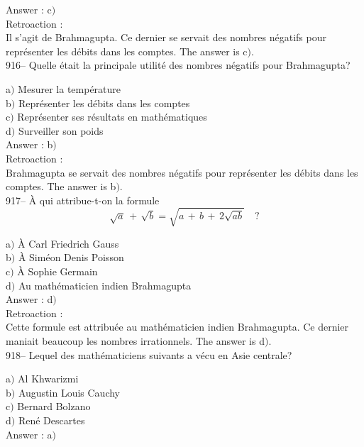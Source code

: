 ﻿\documentclass[letterpaper, 12pt]{article}
\begin{document}
Answer : c$)$\\

Retroaction : \\
Il s'agit de Brahmagupta. Ce dernier se servait des nombres n\'egatifs pour
repr\'esenter les d\'ebits dans les comptes. The answer is c$)$.\\

916-- Quelle \'etait la principale utilit\'e des nombres n\'egatifs
pour Brahmagupta?

a$)$ Mesurer la temp\'erature \\
b$)$ Repr\'esenter les d\'ebits dans les comptes \\
c$)$ Repr\'esenter ses r\'esultats en math\'ematiques \\
d$)$ Surveiller son poids  \\

Answer : b$)$\\

Retroaction : \\
Brahmagupta se servait des nombres n\'egatifs pour repr\'esenter les
d\'ebits dans les comptes. The answer is b$)$.\\

917-- \`A qui attribue-t-on la formule
$$\sqrt a\,+\,\sqrt b=\sqrt{a\,+\,b\,+\,2\sqrt{ab}}\quad?$$

a$)$ \`A Carl Friedrich Gauss \\
b$)$ \`A Sim\'eon Denis Poisson \\
c$)$ \`A Sophie Germain \\
d$)$ Au math\'ematicien indien Brahmagupta  \\

Answer : d$)$\\

Retroaction : \\
Cette formule est attribu\'ee au math\'ematicien indien Brahmagupta.
Ce dernier maniait
beaucoup les nombres irrationnels. The answer is d$)$.\\

918-- Lequel des math\'ematiciens suivants a v\'ecu en Asie
centrale?

a$)$ Al Khwarizmi \\
b$)$ Augustin Louis Cauchy \\
c$)$ Bernard Bolzano \\
d$)$ Ren\'e Descartes  \\

Answer : a$)$\\
\end{document}
